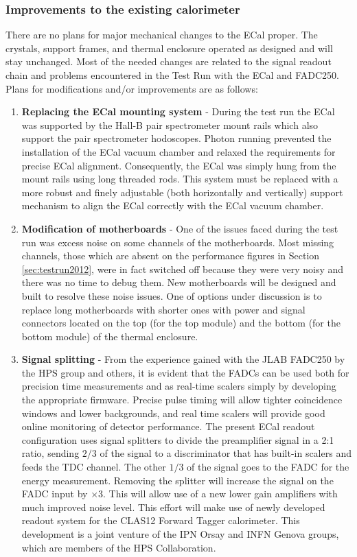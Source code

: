 \subsubsection{Improvements to the existing calorimeter}

There are no plans for major mechanical changes to the ECal proper. The crystals, support frames, and thermal enclosure operated as designed and will stay unchanged. Most of the needed changes are related to the signal readout chain and problems encountered in the Test Run with the ECal and FADC250. Plans for  
modifications and/or improvements are as follows: 

\begin{enumerate}
\item {\bf Replacing the ECal mounting system} - 
During the test run the ECal was supported by the Hall-B pair spectrometer mount rails which also support the pair spectrometer hodoscopes. 
Photon running prevented the installation of the ECal vacuum chamber and relaxed the requirements for precise ECal alignment. Consequently, the ECal was simply hung from the mount rails using  long threaded rods. This system must be replaced with a more robust and finely adjustable (both horizontally and vertically) support mechanism to  align the  ECal correctly with the ECal vacuum chamber.

\item {\bf Modification of motherboards} - One of the issues  faced during the test run was excess noise on some channels of the motherboards. 
Most missing channels, those which are absent on the performance figures in Section \ref{sec:testrun2012}, were in fact switched off because they were very noisy and there was no time to debug them. New motherboards will be designed and built to resolve these noise issues. One of options under discussion is to replace long motherboards with shorter ones with power and signal connectors 
located on the top (for the top module) and the bottom (for the bottom module) of the thermal enclosure. 

\item {\bf Signal splitting} - From the experience gained with the JLAB FADC250 by the HPS group and others, it is evident that the FADCs can be used both for precision time measurements and as 
real-time scalers simply by developing the appropriate firmware.
Precise pulse timing will allow tighter coincidence windows and lower backgrounds, and real time scalers will provide good online monitoring of detector performance. The present ECal readout configuration uses signal splitters to divide the preamplifier signal in  a 2:1 ratio, sending 
$2/3$ of the signal to a discriminator that has built-in scalers and feeds the TDC channel. The other $1/3$ of the 
signal goes to the FADC for the energy measurement. Removing the splitter will increase the signal on the FADC input by $\times 3$. This will allow use of a new lower gain amplifiers with much improved noise level. This effort will make use of newly developed readout system for the CLAS12 Forward Tagger calorimeter. This development is a joint venture of the IPN Orsay and INFN Genova groups, which are members of the HPS Collaboration.

 

\end{enumerate}

